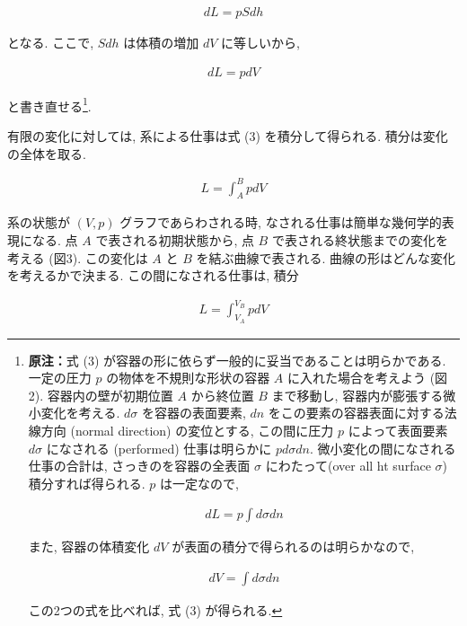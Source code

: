 \begin{align}\tag{2}
dL=pSdh
\end{align}

となる. ここで, $Sdh$ は体積の増加 $dV$ に等しいから,

\begin{align}\tag{3}
dL=pdV
\end{align}

と書き直せる\footnote{\textbf{原注：}式 (3) が容器の形に依らず一般的に妥当であることは明らかである. 一定の圧力 $p$ の物体を不規則な形状の容器 $A$ に入れた場合を考えよう (図2). 容器内の壁が初期位置 $A$ から終位置 $B$ まで移動し, 容器内が膨張する微小変化を考える. $d\sigma$ を容器の表面要素, $dn$ をこの要素の容器表面に対する法線方向 (normal direction) の変位とする, この間に圧力 $p$ によって表面要素 $d\sigma$ になされる (performed) 仕事は明らかに $pd\sigma dn$. 微小変化の間になされる仕事の合計は, さっきのを容器の全表面 $\sigma$ にわたって(over all ht surface $\sigma$) 積分すれば得られる. $p$ は一定なので, 

\begin{align*}
dL=p\int{}{}d\sigma dn
\end{align*}

また, 容器の体積変化 $dV$ が表面の積分で得られるのは明らかなので, 

\begin{align*}
dV=\int{}{}d\sigma dn
\end{align*}

この2つの式を比べれば, 式 (3) が得られる.}.\par

有限の変化に対しては, 系による仕事は式 (3) を積分して得られる. 積分は変化の全体を取る. 

\begin{align}\tag{4}
L=\int_A^BpdV
\end{align}

\par

系の状態が $(V,p)$ グラフであらわされる時, なされる仕事は簡単な幾何学的表現になる. 点 $A$ で表される初期状態から, 点 $B$ で表される終状態までの変化を考える (図3). この変化は $A$ と $B$ を結ぶ曲線で表される. 曲線の形はどんな変化を考えるかで決まる. この間になされる仕事は, 積分

\begin{align}\tag{5}
L=\int_{V_{A}}^{V_{B}}pdV
\end{align}

